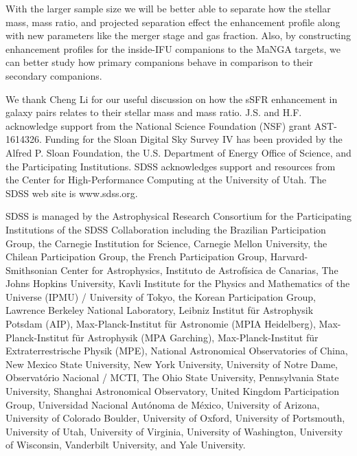 \documentclass[iop,revtex4,twocolumn,apj,numberedappendix,appendixfloats]{emulateapj}
\begin{document}
With the larger sample size we will be better able to separate how the stellar mass, mass ratio, and projected separation effect the enhancement profile along with new parameters like the merger stage and gas fraction. Also, by constructing enhancement profiles for the inside-IFU companions to the MaNGA targets, we can better study how primary companions behave in comparison to their secondary companions. 

\acknowledgments

We thank Cheng Li for our useful discussion on how the sSFR enhancement in galaxy pairs relates to their stellar mass and mass ratio. J.S. and H.F. acknowledge support from the National Science Foundation (NSF) grant AST-1614326. Funding for the Sloan Digital Sky Survey IV has been provided by the Alfred P. Sloan Foundation, the U.S. Department of Energy Office of Science, and the Participating Institutions. SDSS acknowledges support and resources from the Center for High-Performance Computing at the University of Utah. The SDSS web site is www.sdss.org.

SDSS is managed by the Astrophysical Research Consortium for the Participating Institutions of the SDSS Collaboration including the Brazilian Participation Group, the Carnegie Institution for Science, Carnegie Mellon University, the Chilean Participation Group, the French Participation Group, Harvard-Smithsonian Center for Astrophysics, Instituto de Astrofísica de Canarias, The Johns Hopkins University, Kavli Institute for the Physics and Mathematics of the Universe (IPMU) / University of Tokyo, the Korean Participation Group, Lawrence Berkeley National Laboratory, Leibniz Institut für Astrophysik Potsdam (AIP), Max-Planck-Institut für Astronomie (MPIA Heidelberg), Max-Planck-Institut für Astrophysik (MPA Garching), Max-Planck-Institut für Extraterrestrische Physik (MPE), National Astronomical Observatories of China, New Mexico State University, New York University, University of Notre Dame, Observatório Nacional / MCTI, The Ohio State University, Pennsylvania State University, Shanghai Astronomical Observatory, United Kingdom Participation Group, Universidad Nacional Autónoma de México, University of Arizona, University of Colorado Boulder, University of Oxford, University of Portsmouth, University of Utah, University of Virginia, University of Washington, University of Wisconsin, Vanderbilt University, and Yale University.



\end{document}
